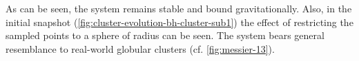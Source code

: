 As can be seen, the system remains stable and bound gravitationally.
Also, in the initial snapshot (\autoref{fig:cluster-evolution-bh-cluster-sub1}) the effect of restricting the sampled points to a sphere of radius can be seen.
The system bears general resemblance to real-world globular clusters (cf. \autoref{fig:messier-13}).